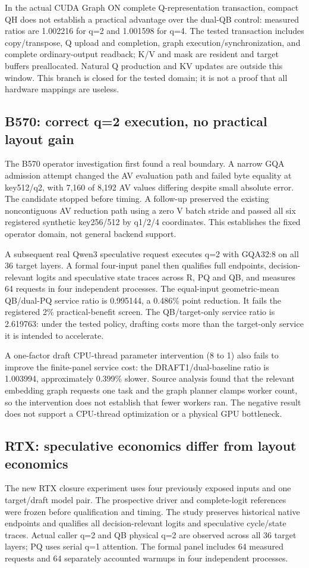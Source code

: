 In the actual CUDA Graph ON complete Q-representation transaction, compact QH does not establish a practical advantage over the dual-QB control: measured ratios are 1.002216 for q=2 and 1.001598 for q=4. The tested transaction includes copy/transpose, Q upload and completion, graph execution/synchronization, and complete ordinary-output readback; K/V and mask are resident and target buffers preallocated. Natural Q production and KV updates are outside this window. This branch is closed for the tested domain; it is not a proof that all hardware mappings are useless.

\subsection{B570: correct q=2 execution, no practical layout gain}
The B570 operator investigation first found a real boundary. A narrow GQA admission attempt changed the AV evaluation path and failed byte equality at key512/q2, with 7,160 of 8,192 AV values differing despite small absolute error. The candidate stopped before timing. A follow-up preserved the existing noncontiguous AV reduction path using a zero V batch stride and passed all six registered synthetic key256/512 by q1/2/4 coordinates. This establishes the fixed operator domain, not general backend support.

A subsequent real Qwen3 speculative request executes q=2 with GQA32:8 on all 36 target layers. A formal four-input panel then qualifies full endpoints, decision-relevant logits and speculative state traces across R, PQ and QB, and measures 64 requests in four independent processes. The equal-input geometric-mean QB/dual-PQ service ratio is 0.995144, a 0.486\% point reduction. It fails the registered 2\% practical-benefit screen. The QB/target-only service ratio is 2.619763: under the tested policy, drafting costs more than the target-only service it is intended to accelerate.

A one-factor draft CPU-thread parameter intervention (8 to 1) also fails to improve the finite-panel service cost: the DRAFT1/dual-baseline ratio is 1.003994, approximately 0.399\% slower. Source analysis found that the relevant embedding graph requests one task and the graph planner clamps worker count, so the intervention does not establish that fewer workers ran. The negative result does not support a CPU-thread optimization or a physical GPU bottleneck.

\subsection{RTX: speculative economics differ from layout economics}
The new RTX closure experiment uses four previously exposed inputs and one target/draft model pair. The prospective driver and complete-logit references were frozen before qualification and timing. The study preserves historical native endpoints and qualifies all decision-relevant logits and speculative cycle/state traces. Actual caller q=2 and QB physical q=2 are observed across all 36 target layers; PQ uses serial q=1 attention. The formal panel includes 64 measured requests and 64 separately accounted warmups in four independent processes.

